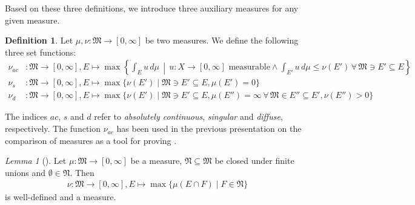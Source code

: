 \documentclass[10pt, leqno]{amsart}
\theoremstyle{definition}
\newtheorem{definition}{Definition}[section]
\theoremstyle{remark}
\newtheorem{lemma}[theorem]{Lemma}
\begin{document}
    \phantom{}
    
    Based on these three definitions, we introduce three auxiliary measures for any given measure.

    \begin{definition} \label{def:basics_on_measure_relations}
        Let \(\mu, \nu\colon \mathfrak{M} \to [0, \infty]\) be two measures. We define the following three set functions:
        \begin{align}
            \nu_{ac}&\colon \mathfrak{M} \to [0, \infty], E \mapsto \max\left\{\int_E u \, d\mu \, \middle\vert \, u\colon X \to [0, \infty] \text{ measurable} \land \int_{E'} u \, d\mu \leq \nu(E') \, \forall \, \mathfrak{M} \ni E' \subseteq E\right\}\\
            \nu_s&\colon \mathfrak{M} \to [0, \infty], E \mapsto \max\{\nu(E') \mid \mathfrak{M} \ni E' \subseteq E, \mu(E') = 0\} \\
            \nu_d&\colon \mathfrak{M} \to [0, \infty], E \mapsto \max\{\nu(E') \mid \mathfrak{M} \ni E' \subseteq E, \mu(E'') = \infty \, \forall \, \mathfrak{M} \in E'' \subseteq E', \nu(E'') > 0\}
        \end{align}
    \end{definition}

    The indices \(ac\), \(s\) and \(d\) refer to \emph{absolutely continuous}, \emph{singular} and \emph{diffuse}, respectively. The function \(\nu_{ac}\) has been used in the previous presentation on the comparison of measures as a tool for proving . %

    \begin{edgebox}
        \begin{lemma}[{\cite[pp. 13-14]{Fonseca}}] \label{lem:special_measure_1}
            Let \(\mu\colon \mathfrak{M} \to [0, \infty]\) be a measure, \(\mathfrak{N} \subseteq \mathfrak{M}\) be closed under finite unions and \(\emptyset \in \mathfrak{N}\). Then
            \begin{align}
                \nu\colon \mathfrak{M} \to [0, \infty], E \mapsto \max\{\mu(E \cap F) \mid F \in \mathfrak{N}\}
            \end{align}
            is well-defined and a measure.
        \end{lemma}
    \end{edgebox}
\end{document}
